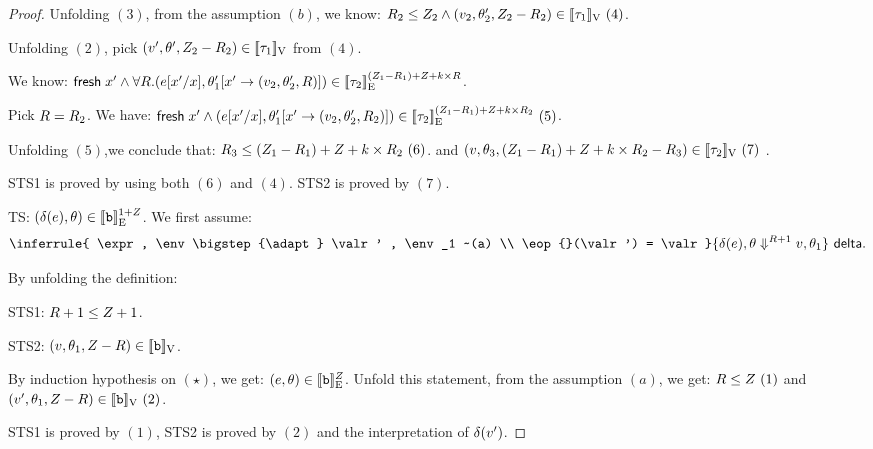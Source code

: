 \begin{proof}
Unfolding $(3)$, from the assumption $(b)$, we know: $\adapt_2 \leq \nnatA_2 \land (\valr_2, \env_2', \nnatA_2-\adapt_2) \in \lrv{\type_1} ~(4)$.

Unfolding $(2)$,  pick $(\valr', \env', \nnatA_2 - \adapt_2 ) \in
\lrv{\type_1} $ from $(4)$.

We know: $ \fresh \eapp x' \land \forall \adapt.  (
\expr[x'/x], \env_1'[ x'  \to (\valr_2, \env_2', \adapt  ) ]  ) \in
\lre{}{ (\nnatA_1- \adapt_1) + \nnatA+\idx\times \adapt }{\type_2} $.

Pick $\adapt = \adapt_2$.
We have: $ \fresh \eapp x' \land  (
\expr[x'/x], \env_1'[ x'  \to (\valr_2, \env_2', \adapt_2  ) ]  ) \in
\lre{}{ (\nnatA_1- \adapt_1) + \nnatA+\idx\times \adapt_2 }{\type_2}
~(5) $.

Unfolding $(5)$,we conclude that: $ \adapt_3 \leq (\nnatA_1 -
\adapt_1) + \nnatA +\idx\times
\adapt_2~(6)$.  and $(\valr, \env_3,   (\nnatA_1- \adapt_1) +
\nnatA+\idx\times \adapt_2 - \adapt_3 ) \in \lrv{\type_2} ~(7) $ .

STS1 is proved by using both $(6)$ and $(4)$.  STS2 is proved by $(7)$. \\


 TS: $(\delta(\expr), \env ) \in  \lre{}{ 1+ \nnatA}{ \tbase }$.
 We first assume:
 \[ \inferrule{
    \expr , \env \bigstep{\adapt} \valr' , \env_1 ~(a) \\
    \eop{}(\valr') = \valr
  }{
    \eop(\expr), \env \bigstep{\adapt +1} \valr,  \env_1
  }~\textsf{delta}.
  \]

  By unfolding the definition:

  STS1: $\adapt+1 \leq \nnatA +1$.
  
STS2: $ (\valr, \env_1, \nnatA- \adapt) \in \lrv{\tbase} $.

By induction hypothesis on $(\star)$, we get: $ (\expr, \env) \in \lre{}{\nnatA}{\tbase} $.
Unfold this statement, from the assumption $(a)$, we get: $ \adapt \leq \nnatA~(1) $ and $ (\valr', \env_1, \nnatA-\adapt)  \in \lrv{\tbase}~(2)$.

STS1 is proved by $(1)$,  STS2 is proved by $(2)$ and the
interpretation of $\delta(\valr')$.





 \end{proof} 